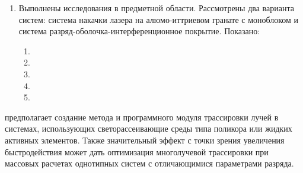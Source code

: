 \begin{enumerate}
	\item Выполнены исследования в предметной области.
	Рассмотрены два варианта систем: система накачки лазера на алюмо-иттриевом гранате с моноблоком и система разряд-оболочка-интерференционное покрытие.
	Показано:
	\begin{enumerate}
		\item
		\item
		\item
		\item
		\item
	\end{enumerate}
\end{enumerate}

 предполагает создание  метода и программного модуля трассировки лучей в системах, использующих светорассеивающие среды типа поликора или жидких активных элементов.
Также значительный эффект с точки зрения увеличения быстродействия может дать оптимизация многолучевой трассировки при массовых расчетах однотипных систем с отличающимися параметрами разряда.
